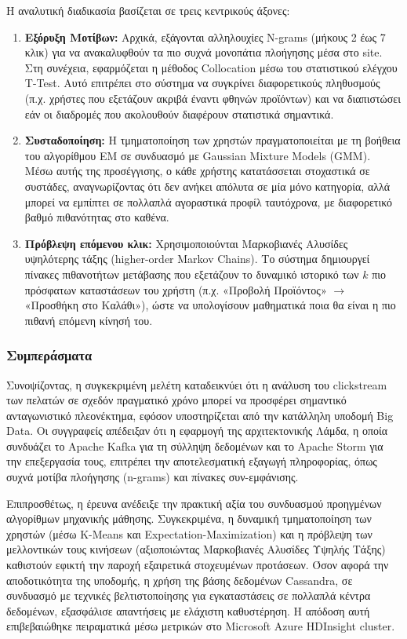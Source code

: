 \documentclass[12pt,a4paper]{article}
\begin{document}
	Η αναλυτική διαδικασία βασίζεται σε τρεις κεντρικούς άξονες:
	\begin{enumerate}
		\item \textbf{Εξόρυξη Μοτίβων:} Αρχικά, εξάγονται αλληλουχίες N-grams (μήκους 2 έως 7 κλικ) για να ανακαλυφθούν τα πιο συχνά μονοπάτια πλοήγησης μέσα στο site. Στη συνέχεια, εφαρμόζεται η μέθοδος Collocation μέσω του στατιστικού ελέγχου T-Test. Αυτό επιτρέπει στο σύστημα να συγκρίνει διαφορετικούς πληθυσμούς (π.χ. χρήστες που εξετάζουν ακριβά έναντι φθηνών προϊόντων) και να διαπιστώσει εάν οι διαδρομές που ακολουθούν διαφέρουν στατιστικά σημαντικά.
		\item \textbf{Συσταδοποίηση:} Η τμηματοποίηση των χρηστών πραγματοποιείται με τη βοήθεια του αλγορίθμου EM σε συνδυασμό με Gaussian Mixture Models (GMM). Μέσω αυτής της προσέγγισης, ο κάθε χρήστης κατατάσσεται στοχαστικά σε συστάδες, αναγνωρίζοντας ότι δεν ανήκει απόλυτα σε μία μόνο κατηγορία, αλλά μπορεί να εμπίπτει σε πολλαπλά αγοραστικά προφίλ ταυτόχρονα, με διαφορετικό βαθμό πιθανότητας στο καθένα.
		\item \textbf{Πρόβλεψη επόμενου κλικ:} Χρησιμοποιούνται Μαρκοβιανές Αλυσίδες υψηλότερης τάξης (higher-order Markov Chains). Το σύστημα δημιουργεί πίνακες πιθανοτήτων μετάβασης που εξετάζουν το δυναμικό ιστορικό των $k$ πιο πρόσφατων καταστάσεων του χρήστη (π.χ. «Προβολή Προϊόντος» $\rightarrow$ «Προσθήκη στο Καλάθι»), ώστε να υπολογίσουν μαθηματικά ποια θα είναι η πιο πιθανή επόμενη κίνησή του.
	\end{enumerate}
	
	\subsubsection{Συμπεράσματα}
	Συνοψίζοντας, η συγκεκριμένη μελέτη καταδεικνύει ότι η ανάλυση του clickstream των πελατών σε σχεδόν πραγματικό χρόνο μπορεί να προσφέρει σημαντικό ανταγωνιστικό πλεονέκτημα, εφόσον υποστηρίζεται από την κατάλληλη υποδομή Big Data. Οι συγγραφείς απέδειξαν ότι η εφαρμογή της αρχιτεκτονικής Λάμδα, η οποία συνδυάζει το Apache Kafka για τη σύλληψη δεδομένων και το Apache Storm για την επεξεργασία τους, επιτρέπει την αποτελεσματική εξαγωγή πληροφορίας, όπως συχνά μοτίβα πλοήγησης (n-grams) και πίνακες συν-εμφάνισης. 
	
	Επιπροσθέτως, η έρευνα ανέδειξε την πρακτική αξία του συνδυασμού προηγμένων αλγορίθμων μηχανικής μάθησης. Συγκεκριμένα, η δυναμική τμηματοποίηση των χρηστών (μέσω K-Means και Expectation-Maximization) και η πρόβλεψη των μελλοντικών τους κινήσεων (αξιοποιώντας Μαρκοβιανές Αλυσίδες Υψηλής Τάξης) καθιστούν εφικτή την παροχή εξαιρετικά στοχευμένων προτάσεων. Όσον αφορά την αποδοτικότητα της υποδομής, η χρήση της βάσης δεδομένων Cassandra, σε συνδυασμό με τεχνικές βελτιστοποίησης για εγκαταστάσεις σε πολλαπλά κέντρα δεδομένων, εξασφάλισε απαντήσεις με ελάχιστη καθυστέρηση. Η απόδοση αυτή επιβεβαιώθηκε πειραματικά μέσω μετρικών στο Microsoft Azure HDInsight cluster.
	
\end{document}
